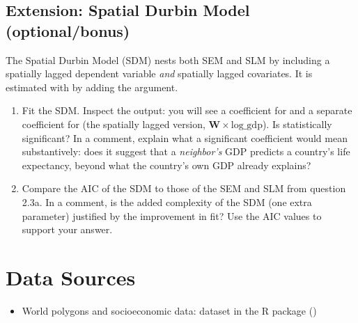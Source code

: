 \subsection{Extension: Spatial Durbin Model (optional/bonus)}

The Spatial Durbin Model (SDM) nests both SEM and SLM by including a spatially lagged dependent variable \textit{and} spatially lagged covariates. It is estimated with  by adding the  argument.

\begin{enumerate}[label=\alph*)]

  \item Fit the SDM. Inspect the output: you will see a coefficient for  and a separate coefficient for  (the spatially lagged version, $\mathbf{W} \times \text{log\_gdp}$). Is  statistically significant? In a comment, explain what a significant  coefficient would mean substantively: does it suggest that a \textit{neighbor's} GDP predicts a country's life expectancy, beyond what the country's own GDP already explains?

  \item Compare the AIC of the SDM to those of the SEM and SLM from question 2.3a. In a comment, is the added complexity of the SDM (one extra parameter) justified by the improvement in fit? Use the AIC values to support your answer.

\end{enumerate}

\vspace{15pt}

\section{Data Sources}

\begin{itemize}
  \item World polygons and socioeconomic data:  dataset in the  R package ()
\end{itemize}

\vspace{15pt}

